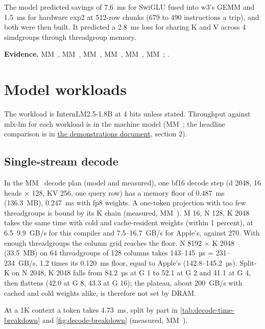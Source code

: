 The model predicted savings of 7.6~ms for SwiGLU fused into w3's GEMM and 1.5~ms for hardware exp2 at 512-row
chunks (679 to 490 instructions a trip), and both were then built. It predicted a 2.8~ms loss for sharing K and V
across 4 simdgroups through threadgroup memory.

\textbf{Evidence.} MM~, MM~, MM~, MM~, MM~, MM~; .

\section{Model workloads}\label{sec:bounds-real-workloads}

The workload is InternLM2.5-1.8B at 4 bits unless stated. Throughput against mlx-lm for each workload is in the
machine model (MM~; the headline comparison is in \href{https://github.com/sbryngelson/AGXForge/blob/main/docs/demonstrations.md}{the demonstrations document}, section 2).

\subsection*{Single-stream decode}

In the MM~ decode plan (model and measured), one bf16 decode step (d 2048, 16 heads × 128, KV 256, one
query row) has a memory floor of 0.487~ms (136.3~MB), 0.247~ms with fp8 weights. A one-token projection with too few
threadgroups is bound by its K chain (measured, MM~). M 16, N 128, K 2048 takes the same time with cold
and cache-resident weights (within 1 percent), at 6.5–9.9~GB/s for this compiler and 7.5–16.7~GB/s for Apple's,
against 270. With enough threadgroups the column grid reaches the floor. N 8192 × K 2048 (33.5~MB) on 64 threadgroups
of 128 columns takes 143–145~µs = 231–234~GB/s, 1.2 times its 0.120~ms floor, equal to Apple's 
(142.8–145.2~µs). Split-K on N 2048, K 2048 falls from 84.2~µs at G 1 to 52.1 at G 2 and 41.1 at G 4, then flattens
(42.0 at G 8, 43.3 at G 16); the plateau, about 200~GB/s with cached and cold weights alike, is therefore not set by
DRAM.

At a 1K context a token takes 4.73~ms, split by part in \cref{tab:decode-time-breakdown} and \cref{fig:decode-breakdown} (measured, MM~).

